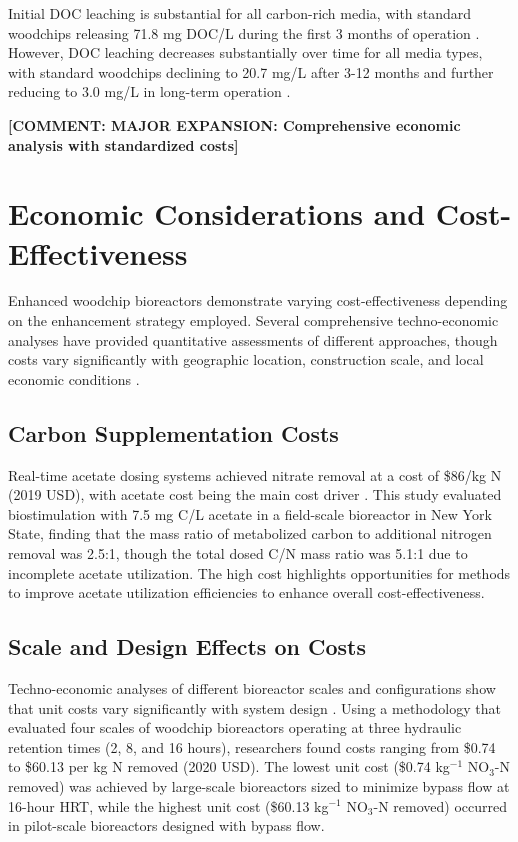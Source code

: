 \documentclass[12pt,a4paper]{article}
\newcommand{\comment}[1]{\textcolor{commenttext}{\textbf{[COMMENT: #1]}}}
\begin{document}
Initial DOC leaching is substantial for all carbon-rich media, with standard woodchips releasing 71.8 mg DOC/L during the first 3 months of operation \citep{RN291}. However, DOC leaching decreases substantially over time for all media types, with standard woodchips declining to 20.7 mg/L after 3-12 months and further reducing to 3.0 mg/L in long-term operation \citep{RN291}.

\comment{MAJOR EXPANSION: Comprehensive economic analysis with standardized costs}

\section{Economic Considerations and Cost-Effectiveness}

Enhanced woodchip bioreactors demonstrate varying cost-effectiveness depending on the enhancement strategy employed. Several comprehensive techno-economic analyses have provided quantitative assessments of different approaches, though costs vary significantly with geographic location, construction scale, and local economic conditions \citep{RN348, RN605}.

\subsection{Carbon Supplementation Costs}

Real-time acetate dosing systems achieved nitrate removal at a cost of \$86/kg N (2019 USD), with acetate cost being the main cost driver \citep{RN196}. This study evaluated biostimulation with 7.5 mg C/L acetate in a field-scale bioreactor in New York State, finding that the mass ratio of metabolized carbon to additional nitrogen removal was 2.5:1, though the total dosed C/N mass ratio was 5.1:1 due to incomplete acetate utilization. The high cost highlights opportunities for methods to improve acetate utilization efficiencies to enhance overall cost-effectiveness.

\subsection{Scale and Design Effects on Costs}

Techno-economic analyses of different bioreactor scales and configurations show that unit costs vary significantly with system design \citep{RN348}. Using a methodology that evaluated four scales of woodchip bioreactors operating at three hydraulic retention times (2, 8, and 16 hours), researchers found costs ranging from \$0.74 to \$60.13 per kg N removed (2020 USD). The lowest unit cost (\$0.74 kg$^{-1}$ NO$_3$-N removed) was achieved by large-scale bioreactors sized to minimize bypass flow at 16-hour HRT, while the highest unit cost (\$60.13 kg$^{-1}$ NO$_3$-N removed) occurred in pilot-scale bioreactors designed with bypass flow.
\end{document}
